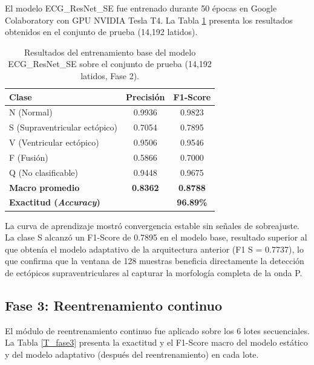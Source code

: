 El modelo ECG\_ResNet\_SE fue entrenado durante 50 épocas en Google Colaboratory con GPU NVIDIA Tesla T4. La Tabla \ref{T_fase2} presenta los resultados obtenidos en el conjunto de prueba (14,192 latidos).

\begin{table}[h]
\caption{Resultados del entrenamiento base del modelo ECG\_ResNet\_SE sobre el conjunto de prueba (14,192 latidos, Fase 2).}
\label{T_fase2}
\begin{center}
\begin{tabular}{lcc}
\hline
\textbf{Clase} & \textbf{Precisión} & \textbf{F1-Score} \\ \hline
N (Normal)                     & 0.9936 & 0.9823 \\
S (Supraventricular ectópico)  & 0.7054 & 0.7895 \\
V (Ventricular ectópico)       & 0.9506 & 0.9546 \\
F (Fusión)                     & 0.5866 & 0.7000 \\
Q (No clasificable)            & 0.9448 & 0.9675 \\
\hline
\textbf{Macro promedio}        & \textbf{0.8362} & \textbf{0.8788} \\
\hline
\multicolumn{2}{l}{\textbf{Exactitud (\textit{Accuracy})}} & \textbf{96.89\%} \\
\hline
\end{tabular}
\end{center}
\end{table}

La curva de aprendizaje mostró convergencia estable sin señales de sobreajuste. La clase S alcanzó un F1-Score de 0.7895 en el modelo base, resultado superior al que obtenía el modelo adaptativo de la arquitectura anterior (F1 S = 0.7737), lo que confirma que la ventana de 128 muestras beneficia directamente la detección de ectópicos supraventriculares al capturar la morfología completa de la onda P.

\subsection{Fase 3: Reentrenamiento continuo}

El módulo de reentrenamiento continuo fue aplicado sobre los 6 lotes secuenciales. La Tabla \ref{T_fase3} presenta la exactitud y el F1-Score macro del modelo estático y del modelo adaptativo (después del reentrenamiento) en cada lote.

